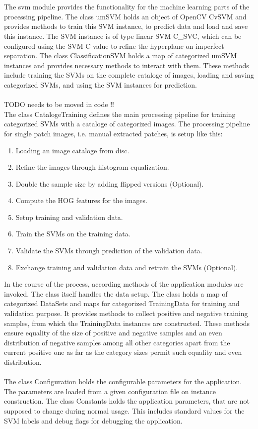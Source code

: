 \\
\\
The svm module provides the functionality for the machine learning parts of the processing pipeline. The class umSVM holds an object of OpenCV CvSVM and provides methods to train this SVM instance, to predict data and load and save this instance. The SVM instance is of type linear SVM C\_SVC, which can be configured using the SVM C value to refine the hyperplane on imperfect separation. The class ClassificationSVM holds a map of categorized umSVM instances and provides necessary methods to interact with them. These methods include training the SVMs on the complete cataloge of images, loading and saving categorized SVMs, and using the SVM instances for prediction.
\\
\\
TODO needs to be moved in code !!
\\
The class CatalogeTraining defines the main processing pipeline for training categorized SVMs with a cataloge of categorized images. The processing pipeline for single patch images, i.e. manual extracted patches, is setup like this:

\begin{enumerate}
	\item Loading an image cataloge from disc.
	\item Refine the images through histogram equalization.
	\item Double the sample size by adding flipped versions (Optional).
	\item Compute the HOG features for the images.
	\item Setup training and validation data.
	\item Train the SVMs on the training data.
	\item Validate the SVMs through prediction of the validation data.
	\item Exchange training and validation data and retrain the SVMs (Optional).
\end{enumerate}

In the course of the process, according methods of the application modules are invoked. The class itself handles the data setup. The class holds a map of categorized DataSets and maps for categorized TrainingData for training and validation purpose. It provides methods to collect positive and negative training samples, from which the TrainingData instances are constructed. These methods ensure equality of the size of positive and negative samples and an even distribution of negative samples among all other categories apart from the current positive one as far as the category sizes permit such equality and even distribution.
\\
\\
The class Configuration holds the configurable parameters for the application. The parameters are loaded from a given configuration file on instance construction. The class Constants holds the application parameters, that are not supposed to change during normal usage. This includes standard values for the SVM labels and debug flags for debugging the application.